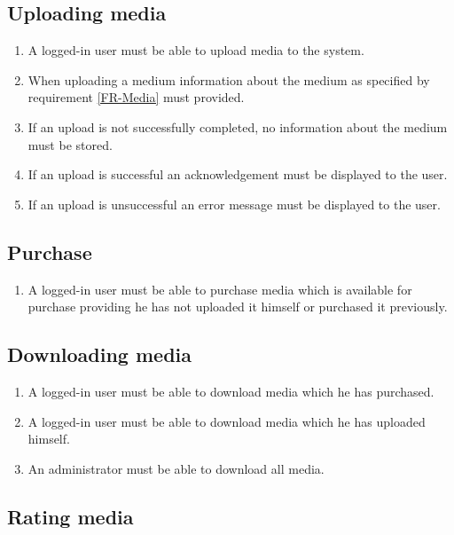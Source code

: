 \documentclass[../report.tex]{subfiles}
\begin{document}
\subsection {Uploading media}

\begin{enumerate}[label=FR-\twodigits*, resume]
	\item A logged-in user must be able to upload media to the system.
	\item When uploading a medium information about the medium as specified by requirement \ref{FR-Media} must provided.
	\item If an upload is not successfully completed, no information about the medium must be stored.
	\item If an upload is successful an acknowledgement must be displayed to the user.
	\item If an upload is unsuccessful an error message must be displayed to the user. 
\end{enumerate}

\subsection {Purchase}

\begin{enumerate}[label=FR-\twodigits*, resume]
	\item A logged-in user must be able to purchase media which is available for purchase providing he has not uploaded it himself or  purchased it previously.
\end{enumerate}

\subsection {Downloading media}

\begin{enumerate}[label=FR-\twodigits*, resume]
	\item A logged-in user must be able to download media which he has purchased.
	\item A logged-in user must be able to download media which he has uploaded himself.
	\item An administrator must be able to download all media.
\end{enumerate}
		
\subsection {Rating media} \label{FR-RatingMedia}
\end{document}
